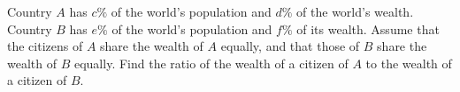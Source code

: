 Country $A$ has $c\%$ of the world's population and $d\%$ of the world's wealth. Country $B$ has $e\%$ of the world's population and $f\%$ of its wealth. Assume that the citizens of $A$ share the wealth of $A$ equally, and that those of $B$ share the wealth of $B$ equally. Find the ratio of the wealth of a citizen of $A$ to the wealth of a citizen of $B$.
